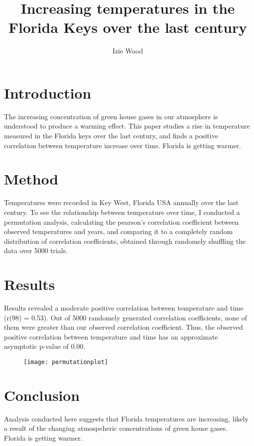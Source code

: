 \documentclass[11pt]{article}
\title{\vspace{-3cm}\Large Increasing temperatures in the Florida Keys over the last century}
\author{\vspace{-1cm}\normalsize Izie Wood}
\date{\normalsize}
\begin{document}
\maketitle{\large}
\vspace{-1cm}
\section{Introduction}
        The  increasing concentration of green house gases
    in our atmosphere is understood to produce a warming effect. This paper studies a rise in temperature measured in the Florida keys 
    over the last century, and finds a positive correlation between temperature increase
    over time. Florida is getting warmer. 
\section{Method}
        Temperatures were recorded in Key West, Florida USA annually over the last century. 
    To see the relationship between temperature over time, I conducted a permutation analysis, calculating the 
    pearson's correlation coefficient between observed temperatures and years, and comparing 
    it to a completely random distribution of correlation coefficients, obtained through
    randomely shuffling the data over 5000 trials. 
\section{Results}
            Results revealed a moderate positive correlation between temperature and time
        (r(98) = 0.53). Out of 5000 randomely generated correlation coefficients, none of them were 
        greater than our observed correlation coefficient. Thus, the observed positive correlation between temperature and time has an 
        approximate asymptotic p-value of 0.00.   
        \begin{figure}[ht]
        \begin{center}
            \texttt{[image: permutationplot]}
        \end{center}
        \end{figure}
\section{Conclusion}
    Analysis conducted here suggests that Florida temperatures are increasing, likely
    a result of the changing atmospeheric concentrations of green house gases. Florida is 
    getting warmer.
\end{document}
